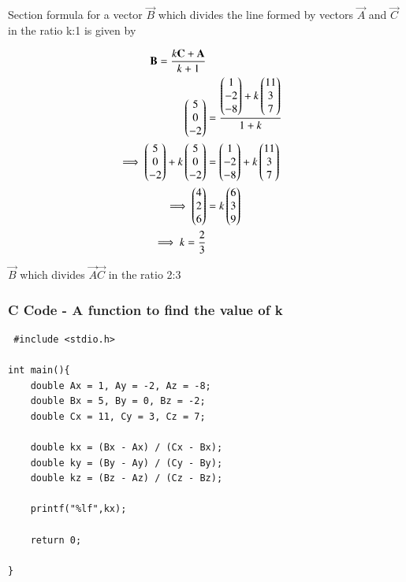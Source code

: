 \documentclass{beamer}
\begin{document}
\begin{frame}
 Section formula for a vector $\vec{B}$ which divides the line formed by vectors $\vec{A}$ and $\vec{C}$ in the ratio k:1 is given by

\begin{align}
    \mathbf{B}=\frac{k\mathbf{C}+\mathbf{A}}{k+1}\\
             \begin{pmatrix}5\\0\\-2\end{pmatrix} &=\frac{{\begin{pmatrix}1\\-2\\-8\end{pmatrix}+k\begin{pmatrix}11\\3\\7\end{pmatrix}}}{1+k}\\
    \implies\begin{pmatrix}5\\0\\-2\end{pmatrix} + k\begin{pmatrix}5\\0\\-2\end{pmatrix} &=\begin{pmatrix}1\\-2\\-8\end{pmatrix}+k\begin{pmatrix}11\\3\\7\end{pmatrix}\\ 
    \implies \begin{pmatrix}4 \\2 \\6\end{pmatrix} &= k\begin{pmatrix}6 \\ 3 \\9\end{pmatrix}\\
    \implies k = \frac{2}{3}
\end{align}

 $\vec{B}$ which divides  $\vec{A}\vec{C}$ in the ratio 2:3

\end{frame}


\begin{frame}[fragile]
    \frametitle{C Code - A function to find the value of k}

    \begin{lstlisting}
 #include <stdio.h>

int main(){
    double Ax = 1, Ay = -2, Az = -8;
    double Bx = 5, By = 0, Bz = -2;
    double Cx = 11, Cy = 3, Cz = 7;

    double kx = (Bx - Ax) / (Cx - Bx);
    double ky = (By - Ay) / (Cy - By);
    double kz = (Bz - Az) / (Cz - Bz);

    printf("%lf",kx);

    return 0;

}


    \end{lstlisting}
\end{frame}
\end{document}
